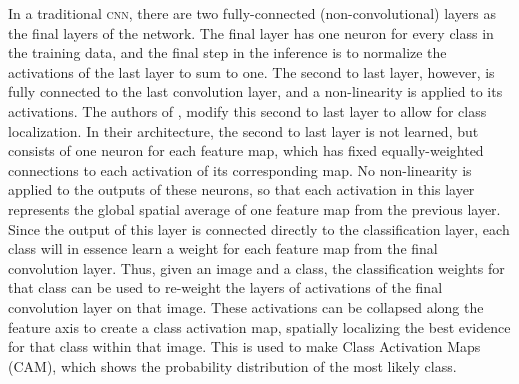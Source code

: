 In a traditional \textsc{cnn}, there are two fully-connected (non-convolutional) layers as the final layers of the network. 
The final layer has one neuron for every class in the training data, and the final step in the inference is to normalize the activations of the last layer to sum to one.
The second to last layer, however, is fully connected to the last convolution layer, and a non-linearity is applied to its activations.
The authors of \cite{xxx_oquab2015object}, \cite{xxx_zhou2015learning} modify this second to last layer to allow for class localization.
In their architecture, the second to last layer is not learned, but consists of one neuron for each feature map, which has fixed  equally-weighted connections to each activation of its corresponding map.
No non-linearity is applied to the outputs of these neurons, so that each activation in this layer represents the global spatial average of one feature map from the previous layer.
Since the output of this layer is connected directly to the classification layer, each class will in essence learn a weight for each feature map from the final convolution layer.
Thus, given an image and a class, the classification weights for that class can be used to re-weight the layers of activations of the final convolution layer on that image.
These activations can be collapsed along the feature axis to create a class activation map, spatially localizing the best evidence for that class within that image. 
This is used to make Class Activation Maps (CAM), which shows the probability distribution of the most likely class.

